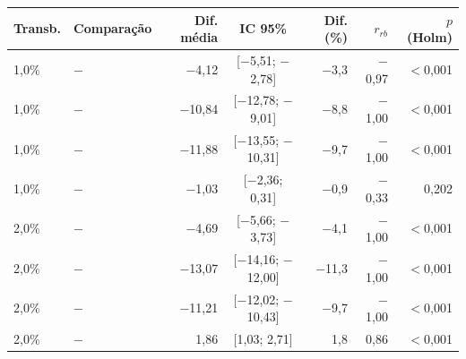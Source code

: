\begin{tabular}{@{}llrcrrr@{}}
\toprule
Transb. & Comparação & Dif. média & IC 95\% & Dif. (\%) & $r_{rb}$ & $p$ (Holm) \\
\midrule
1,0\% & \polBOR{} $-$ \polA{} & $-$4,12 & [$-$5,51; $-$2,78] & $-$3,3 & $-$0,97 & $<$0,001 \\
1,0\% & \polC{} $-$ \polA{} & $-$10,84 & [$-$12,78; $-$9,01] & $-$8,8 & $-$1,00 & $<$0,001 \\
1,0\% & \polD{} $-$ \polA{} & $-$11,88 & [$-$13,55; $-$10,31] & $-$9,7 & $-$1,00 & $<$0,001 \\
1,0\% & \polD{} $-$ \polC{} & $-$1,03 & [$-$2,36; 0,31] & $-$0,9 & $-$0,33 & 0,202 \\
2,0\% & \polBOR{} $-$ \polA{} & $-$4,69 & [$-$5,66; $-$3,73] & $-$4,1 & $-$1,00 & $<$0,001 \\
2,0\% & \polC{} $-$ \polA{} & $-$13,07 & [$-$14,16; $-$12,00] & $-$11,3 & $-$1,00 & $<$0,001 \\
2,0\% & \polD{} $-$ \polA{} & $-$11,21 & [$-$12,02; $-$10,43] & $-$9,7 & $-$1,00 & $<$0,001 \\
2,0\% & \polD{} $-$ \polC{} & 1,86 & [1,03; 2,71] & 1,8 & 0,86 & $<$0,001 \\
\bottomrule
\end{tabular}
